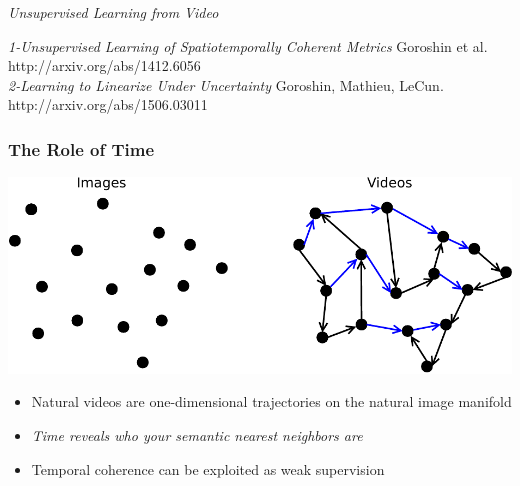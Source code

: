 \documentclass{beamer}
\begin{document}
\begin{frame}
\begin{center} 
\huge \color{blue} \emph{Unsupervised Learning from Video} \newline 
\end{center} 
\begin{center} 
\color{blue} \small{\emph{1-Unsupervised Learning of Spatiotemporally Coherent Metrics}\newline 
Goroshin et al. http://arxiv.org/abs/1412.6056 \\ \vspace{0.2cm} 
\color{blue} \emph{2-Learning to Linearize Under Uncertainty}\newline 
Goroshin, Mathieu, LeCun. http://arxiv.org/abs/1506.03011} 
\end{center} 
\end{frame} 

\begin{frame} 
\frametitle{The Role of Time}
\begin{center} 
\includegraphics[scale=0.4]{./Figures/time.pdf}
\end{center} 
\begin{itemize} 
\item{Natural videos are one-dimensional trajectories on the natural image manifold}
\item{\emph{Time reveals who your semantic nearest neighbors are}}
\item{Temporal coherence can be exploited as weak supervision}
\end{itemize} 
\end{frame} 
\end{document}
